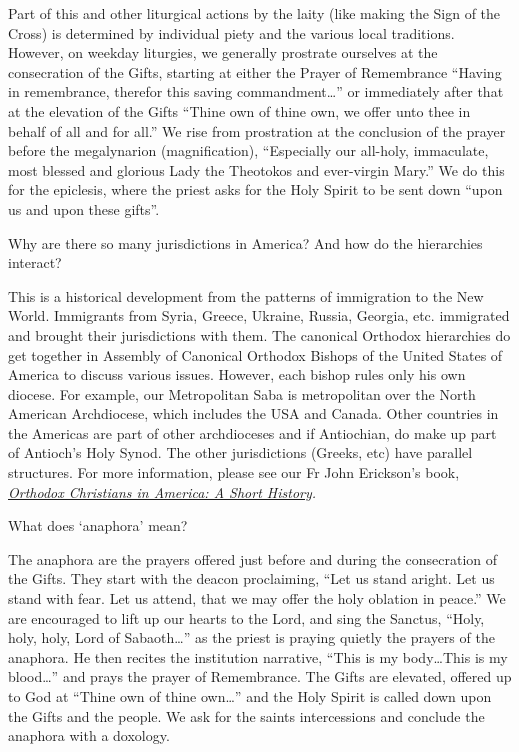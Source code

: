 \documentclass[
]{article}
\begin{document}
Part of this and other liturgical actions by the laity (like making the
Sign of the Cross) is determined by individual piety and the various
local traditions. However, on weekday liturgies, we generally prostrate
ourselves at the consecration of the Gifts, starting at either the
Prayer of Remembrance ``Having in remembrance, therefor this saving
commandment\ldots{}'' or immediately after that at the elevation of the
Gifts ``Thine own of thine own, we offer unto thee in behalf of all and
for all.'' We rise from prostration at the conclusion of the prayer
before the megalynarion (magnification), ``Especially our all-holy,
immaculate, most blessed and glorious Lady the Theotokos and ever-virgin
Mary.'' We do this for the epiclesis, where the priest asks for the Holy
Spirit to be sent down ``upon us and upon these gifts''.

Why are there so many jurisdictions in America? And how do the
hierarchies interact?

This is a historical development from the patterns of immigration to the
New World. Immigrants from Syria, Greece, Ukraine, Russia, Georgia, etc.
immigrated and brought their jurisdictions with them. The canonical
Orthodox hierarchies do get together in Assembly of Canonical Orthodox
Bishops of the United States of America to discuss various issues.
However, each bishop rules only his own diocese. For example, our
Metropolitan Saba is metropolitan over the North American Archdiocese,
which includes the USA and Canada. Other countries in the Americas are
part of other archdioceses and if Antiochian, do make up part of
Antioch's Holy Synod. The other jurisdictions (Greeks, etc) have
parallel structures. For more information, please see our Fr John
Erickson's book,
\emph{\href{https://www.amazon.com/Orthodox-Christians-America-Religion-American/dp/019533308X}{\ul{Orthodox
Christians in America: A Short History}}.}

What does `anaphora' mean?

The anaphora are the prayers offered just before and during the
consecration of the Gifts. They start with the deacon proclaiming, ``Let
us stand aright. Let us stand with fear. Let us attend, that we may
offer the holy oblation in peace.'' We are encouraged to lift up our
hearts to the Lord, and sing the Sanctus, ``Holy, holy, holy, Lord of
Sabaoth\ldots{}'' as the priest is praying quietly the prayers of the
anaphora. He then recites the institution narrative, ``This is my
body\ldots This is my blood\ldots{}'' and prays the prayer of
Remembrance. The Gifts are elevated, offered up to God at ``Thine own of
thine own\ldots{}'' and the Holy Spirit is called down upon the Gifts
and the people. We ask for the saints intercessions and conclude the
anaphora with a doxology.
\end{document}
